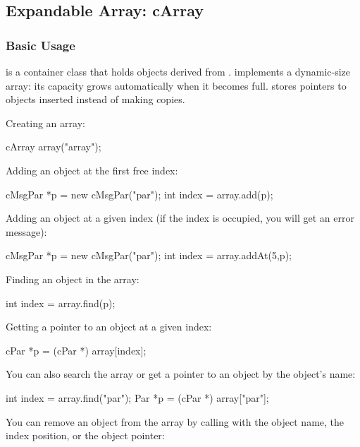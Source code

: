 \subsection{Expandable Array: cArray}
\label{sec:sim-lib:carray}

\subsubsection{Basic Usage}
\label{sec:sim-lib:carray-basic-usage}

 is a container class that holds objects derived from
.  implements a dynamic-size array: its
capacity grows automatically when it becomes full.  stores
pointers to objects inserted instead of making copies.

Creating an array:

\begin{cpp}
cArray array("array");
\end{cpp}

Adding an object at the first free index:

\begin{cpp}
cMsgPar *p = new cMsgPar("par");
int index = array.add(p);
\end{cpp}

Adding an object at a given index (if the index is occupied,
you will get an error message):

\begin{cpp}
cMsgPar *p = new cMsgPar("par");
int index = array.addAt(5,p);
\end{cpp}

Finding an object in the array:

\begin{cpp}
int index = array.find(p);
\end{cpp}

Getting a pointer to an object at a given index:

\begin{cpp}
cPar *p = (cPar *) array[index];
\end{cpp}

You can also search the array or get a pointer to an object by
the object's name:

\begin{cpp}
int index = array.find("par");
Par *p = (cPar *) array["par"];
\end{cpp}

You can remove an object from the array by calling 
with the object name, the index position, or the object pointer:

